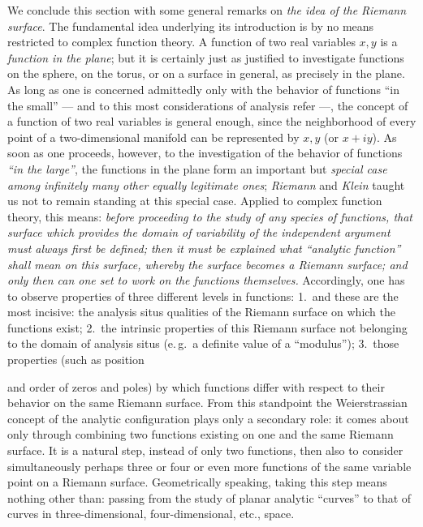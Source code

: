 \documentclass{article}
\begin{document}
We conclude this section with some general remarks on \emph{the idea of the Riemann surface}. The fundamental idea underlying its introduction is by no means restricted to complex function theory. A function of two real variables $x, y$ is a \emph{function in the plane}; but it is certainly just as justified to investigate functions on the sphere, on the torus, or on a surface in general, as precisely in the plane. As long as one is concerned admittedly only with the behavior of functions ``in the small'' --- and to this most considerations of analysis refer ---, the concept of a function of two real variables is general enough, since the neighborhood of every point of a two-dimensional manifold can be represented by $x, y$ (or $x + iy$). As soon as one proceeds, however, to the investigation of the behavior of functions \emph{``in the large''}, the functions in the plane form an important but \emph{special case among infinitely many other equally legitimate ones}; \emph{Riemann} and \emph{Klein} taught us not to remain standing at this special case. Applied to complex function theory, this means: \emph{before proceeding to the study of any species of functions, that surface which provides the domain of variability of the independent argument must always first be defined; then it must be explained what ``analytic function'' shall mean on this surface, whereby the surface becomes a Riemann surface; and only then can one set to work on the functions themselves.} Accordingly, one has to observe properties of three different levels in functions: 1.~and these are the most incisive: the analysis situs qualities of the Riemann surface on which the functions exist; 2.~the intrinsic properties of this Riemann surface not belonging to the domain of analysis situs (e.\,g.\ a definite value of a ``modulus''); 3.~those properties (such as position

and order of zeros and poles) by which functions differ with respect to their behavior on the same Riemann surface. From this standpoint the Weierstrassian concept of the analytic configuration plays only a secondary role: it comes about only through combining two functions existing on one and the same Riemann surface. It is a natural step, instead of only two functions, then also to consider simultaneously perhaps three or four or even more functions of the same variable point on a Riemann surface. Geometrically speaking, taking this step means nothing other than: passing from the study of planar analytic ``curves'' to that of curves in three-dimensional, four-dimensional, etc., space.
\end{document}

